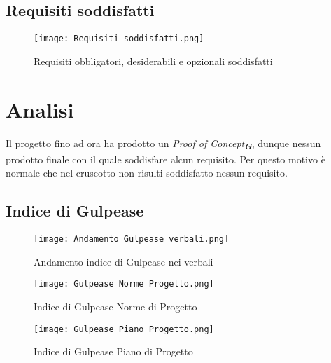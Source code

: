 \newpage

\subsection{Requisiti soddisfatti}
\label{subsec:Requisiti soddisfatti}

\begin{figure}[h] 
    \centering
    \texttt{[image: Requisiti soddisfatti.png]}
    \caption{Requisiti obbligatori, desiderabili e opzionali soddisfatti} 
    \label{fig: Requisiti soddisfatti}
\end{figure}

\section*{Analisi}
Il progetto fino ad ora ha prodotto un \emph{Proof of Concept}\textsubscript{\textbf{\textit{G}}}, dunque nessun prodotto finale con il quale soddisfare alcun requisito.
Per questo motivo è normale che nel cruscotto non risulti soddisfatto nessun requisito.

\newpage

\subsection{Indice di Gulpease}
\label{subsec:Indice di Gulpease}

\begin{figure}[h!] 
    \centering
    \texttt{[image: Andamento Gulpease verbali.png]}
    \caption{Andamento indice di Gulpease nei verbali} 
    \label{fig: Andamento Gulpease verbali}
\end{figure}

\begin{figure}[h!]
    \centering

    \begin{minipage}{.4\textwidth}
        \centering
        \texttt{[image: Gulpease Norme Progetto.png]}
        \caption{Indice di Gulpease Norme di Progetto}
        \label{fig:Gulpease Norme Progetto}
    \end{minipage}
    \hfill
    \begin{minipage}{.4\textwidth}
        \centering
        \texttt{[image: Gulpease Piano Progetto.png]}
        \caption{Indice di Gulpease Piano di Progetto}
        \label{fig:Gulpease Piano Progetto}
    \end{minipage}

\end{figure}


